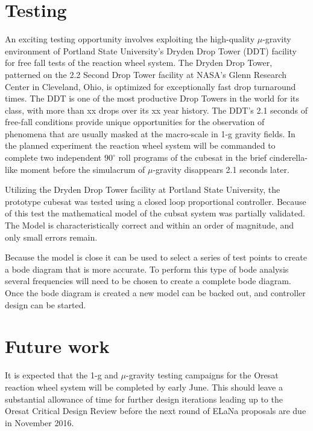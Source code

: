 \documentclass[]{aiaa-tc}%
\begin{document}
\section{Testing}
An exciting testing opportunity involves exploiting the high-quality $\mu$-gravity environment of Portland State University's Dryden Drop Tower (DDT) facility for free fall tests of the reaction wheel system. The Dryden Drop Tower, patterned on the 2.2 Second Drop Tower facility at NASA's Glenn Research Center in Cleveland, Ohio, is optimized for exceptionally fast drop turnaround times. The DDT is one of the most productive Drop Towers in the world for its class, with more than xx drops over its xx year history. The DDT's 2.1 seconds of free-fall conditions provide unique opportunities for the observation of phenomena that are usually masked at the macro-scale in 1-g gravity fields. In the planned experiment the reaction wheel system will be commanded to complete two independent $90^{\circ}$ roll programs of the cubesat in the brief cinderella-like moment before the simulacrum of $\mu$-gravity disappears 2.1 seconds later.

Utilizing the Dryden Drop Tower facility at Portland State University, the prototype cubesat was tested using a closed loop proportional controller. Because of this test the mathematical model of the cubsat system was partially validated. The Model is characteristically correct and within an order of magnitude, and only small errors remain.

Because the model is close it can be used to select a series of test points to create a bode diagram that is more accurate. To perform this type of bode analysis several frequencies will need to be chosen to create a complete bode diagram. Once the bode diagram is created a new model can be backed out, and controller design can be started.

\newpage
\section{Future work}
It is expected that the 1-g and $\mu$-gravity testing campaigns for the Oresat reaction wheel system will be completed by early June. This should leave a substantial allowance of time for further design iterations leading up to the Oresat Critical Design Review before the next round of ELaNa proposals are due in November 2016.
\end{document}
